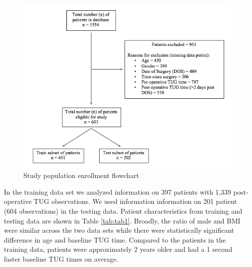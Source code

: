 \documentclass[fleqn,10pt]{wlscirep}\usepackage{knitr}
\begin{document}
\begin{figure}[!htbp]
\centering
\includegraphics[width=\linewidth]{fig1}
\caption{Study population enrollment flowchart}
\label{fig:fig1}
\end{figure}



In the training data set we analyzed information on 397 patients with 1,339 post-operative TUG observations. We used information information on 201 patient (604 observations) in the testing data. Patient characteristics from training and testing data are shown in Table \ref{tab:tab1}. Broadly, the ratio of male and BMI were similar across the two data sets while there were statistically significant difference in age and baseline TUG time. Compared to the patients in the training data, patients were approximately 2 years older and had a 1 second faster baseline TUG times on average. 

\begin{table}

\caption{\label{tab:tab1}Baseline Characteristics of Training and Testing Set}
\centering
{}
\end{table}
\end{document}
